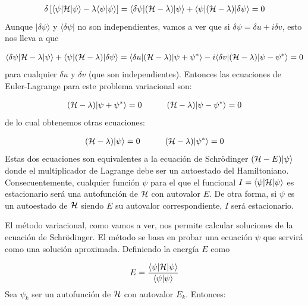 \begin{eqnarray}
	\delta \left[ \langle \psi |\mathcal{H} |\psi \rangle - \lambda \langle \psi |\psi \rangle  \right] = \langle \delta \psi | (\mathcal{H} - \lambda) | \psi \rangle + \langle \psi | (\mathcal{H} - \lambda) |\delta \psi \rangle = 0
\end{eqnarray}
Aunque $|\delta \psi \rangle$ y $\langle \delta \psi |$ no son independientes, vamos a ver que si $\delta \psi = \delta u + i \delta v$, esto nos lleva a que

\begin{equation}
	\langle \delta \psi |\mathcal{H} - \lambda |\psi \rangle + \langle \psi |(\mathcal{H} - \lambda) |\delta \psi \rangle  = \langle \delta u | (\mathcal{H} - \lambda) | \psi + \psi^* \rangle - i \langle \delta v |(\mathcal{H} - \lambda ) |\psi - \psi^* \rangle    = 0
\end{equation}
para cualquier $\delta u $ y $\delta v$ (que son independientes). Entonces las ecuaciones de Euler-Lagrange para este problema variacional son:

\begin{eqnarray}
	(\mathcal{H} - \lambda) |\psi + \psi^* \rangle = 0 \quad \quad \quad (\mathcal{H} - \lambda) |\psi - \psi^*\rangle = 0
\end{eqnarray}
de lo cual obtenemos otras ecuaciones:

\begin{eqnarray}
	(\mathcal{H} - \lambda) |\psi \rangle = 0 \quad \quad \quad (\mathcal{H} - \lambda) |\psi^*\rangle = 0
\end{eqnarray}
Estas dos ecuaciones son equivalentes a la ecuación de Schrödinger $(\mathcal{H} - E) |\psi\rangle$ donde el multiplicador de Lagrange debe ser un autoestado del Hamiltoniano. Consecuentemente, cualquier función $\psi$ para el que el funcional $I=\langle \psi | \mathcal{H} | \psi \rangle $ es estacionario será una autofunción de $\mathcal{H}$ con autovalor $E$. De otra forma, si $\psi$ es un autoestado de $\mathcal{H}$ siendo $E$ su autovalor correspondiente, $
I$ será estacionario.

El método variacional, como vamos a ver, nos permite calcular soluciones de la ecuación de Schrödinger. El método se basa en probar una ecuación $\psi$ que servirá como una solución aproximada. Definiendo la energía $E$ como

\begin{eqnarray}
	E = \frac{\langle \psi |\mathcal{H} |\psi \rangle}{\langle \psi |\psi \rangle}
\end{eqnarray}
Sea $\psi_k$ ser un autofunción de $\mathcal{H}$ con autovalor $E_k$. Entonces:


